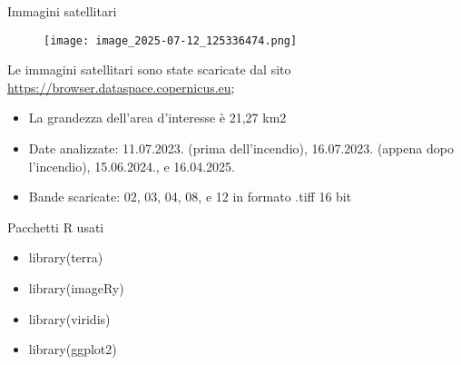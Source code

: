 \documentclass{beamer} %
\begin{document}
        \begin{frame}{Immagini satellitari}
        \begin{figure}
            \centering
            \texttt{[image: image\_2025-07-12\_125336474.png]}
        \end{figure}
            \begin{center}
            Le immagini satellitari sono state scaricate dal sito \url{https://browser.dataspace.copernicus.eu};
                \begin{itemize}
                    \item La grandezza dell'area d'interesse è 21,27 km2
                    \item Date analizzate: 11.07.2023. (prima dell'incendio), 16.07.2023. (appena dopo l'incendio), 15.06.2024., e 16.04.2025.
                    \item Bande scaricate: 02, 03, 04, 08, e 12 in formato .tiff 16 bit
                \end{itemize}
            \end{center}
        \end{frame}

        \begin{frame}{Pacchetti R usati}
            \begin{itemize}
                \centering
                \item library(terra)
                \item library(imageRy)
                \item library(viridis)
                \item library(ggplot2)
            \end{itemize}
        \end{frame}
        
\end{document}
